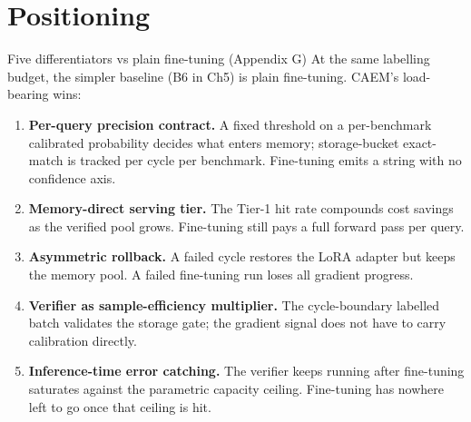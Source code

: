 \documentclass[10pt,aspectratio=169]{beamer}
\begin{document}
\section*{Positioning}

\begin{frame}{Five differentiators vs plain fine-tuning (Appendix G)}
  \footnotesize
  At the same labelling budget, the simpler baseline (B6 in Ch5) is plain fine-tuning. CAEM's load-bearing wins:

  \vspace{0.4em}
  \begin{enumerate}\scriptsize
    \item \textbf{Per-query precision contract.} A fixed threshold on a per-benchmark calibrated probability decides what enters memory; storage-bucket exact-match is tracked per cycle per benchmark. Fine-tuning emits a string with no confidence axis.
    \item \textbf{Memory-direct serving tier.} The Tier-1 hit rate compounds cost savings as the verified pool grows. Fine-tuning still pays a full forward pass per query.
    \item \textbf{Asymmetric rollback.} A failed cycle restores the LoRA adapter but keeps the memory pool. A failed fine-tuning run loses all gradient progress.
    \item \textbf{Verifier as sample-efficiency multiplier.} The cycle-boundary labelled batch validates the storage gate; the gradient signal does not have to carry calibration directly.
    \item \textbf{Inference-time error catching.} The verifier keeps running after fine-tuning saturates against the parametric capacity ceiling. Fine-tuning has nowhere left to go once that ceiling is hit.
  \end{enumerate}
\end{frame}
\end{document}
